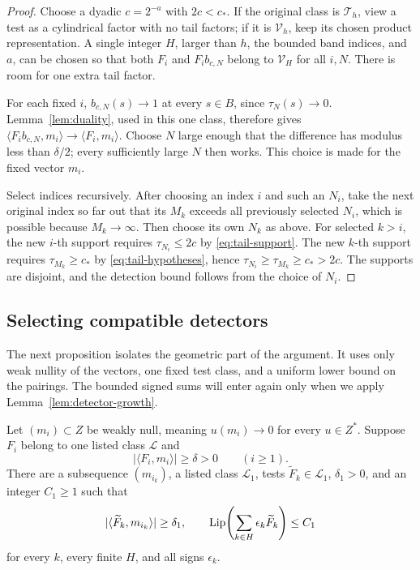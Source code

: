 \begin{proof}
Choose a dyadic \(c=2^{-a}\) with \(2c<c_*\). If the original class
is \(\mathcal T_h\), view a test as a cylindrical factor with no tail
factors; if it is \(\mathcal V_h\), keep its chosen product
representation. A single integer \(H\), larger than \(h\), the
bounded band indices, and \(a\), can be chosen so that both \(F_i\)
and \(F_i b_{c,N}\) belong to \(\mathcal V_H\) for all \(i,N\).
There is room for one extra tail factor.

For each fixed \(i\), \(b_{c,N}(s)\to1\) at every \(s\in B\), since
\(\tau_N(s)\to0\). Lemma~\ref{lem:duality}, used in this one class,
therefore gives
\(\langle F_i b_{c,N},m_i\rangle\to\langle F_i,m_i\rangle\).
Choose \(N\) large enough that the difference has modulus less than
\(\delta/2\); every sufficiently large \(N\) then works. This choice
is made for the fixed vector \(m_i\).

Select indices recursively. After choosing an index \(i\) and such
an \(N_i\), take the next original index so far out that its \(M_k\)
exceeds all previously selected \(N_i\), which is possible because
\(M_k\to\infty\). Then choose its own \(N_k\) as above. For selected
\(k>i\), the new \(i\)-th support requires \(\tau_{N_i}\leq2c\)
by \eqref{eq:tail-support}. The new \(k\)-th support requires
\(\tau_{M_k}\geq c_*\) by \eqref{eq:tail-hypotheses}, hence
\(\tau_{N_i}\geq\tau_{M_k}\geq c_*>2c\). The supports are disjoint,
and the detection bound follows from the choice of \(N_i\).
\end{proof}

\subsection{Selecting compatible detectors}

The next proposition isolates the geometric part of the argument. It
uses only weak nullity of the vectors, one fixed test class, and a
uniform lower bound on the pairings. The bounded signed sums will enter
again only when we apply Lemma~\ref{lem:detector-growth}.

\begin{proposition}
\label{prop:compatible-detectors}
Let \((m_i)\subset Z\) be weakly null, meaning
\(u(m_i)\to0\) for every \(u\in Z^*\). Suppose \(F_i\) belong to one
listed class \(\mathcal L\) and
\begin{equation}
                  |\langle F_i,m_i\rangle|\geq\delta>0
                  \qquad(i\geq1).
                  \label{eq:selection-detection}
\end{equation}
There are a subsequence \((m_{i_k})\), a listed class
\(\mathcal L_1\), tests \(\widetilde F_k\in\mathcal L_1\),
\(\delta_1>0\), and an integer \(C_1\geq1\) such that
\[
 |\langle\widetilde F_k,m_{i_k}\rangle|\geq\delta_1,
 \qquad
 \operatorname{Lip}\!\left(\sum_{k\in H}\epsilon_k\widetilde F_k\right)\leq C_1
\]
for every \(k\), every finite \(H\), and all signs \(\epsilon_k\).
\end{proposition}

